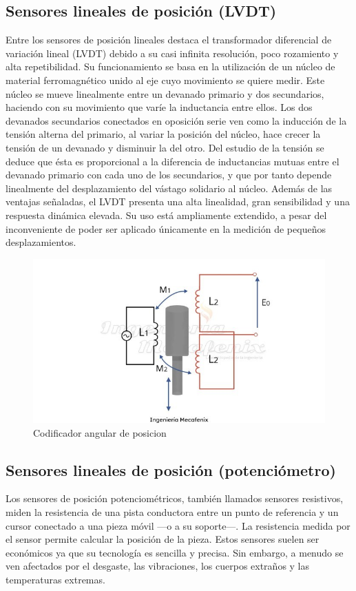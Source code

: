 \subsection{Sensores lineales de posición (LVDT)}

Entre los sensores de posición lineales destaca el transformador diferencial de variación lineal (LVDT) debido a su casi infinita resolución, poco rozamiento y alta repetibilidad. Su funcionamiento se basa en la utilización de un núcleo de material ferromagnético unido al eje cuyo movimiento se quiere medir. Este núcleo se mueve linealmente entre un devanado primario y dos secundarios, haciendo con su movimiento que varíe la inductancia entre ellos.
Los dos devanados secundarios conectados en oposición serie ven como la inducción de la tensión alterna del primario, al variar la posición del núcleo, hace crecer la tensión de un devanado y disminuir la del otro. Del estudio de la tensión se deduce que ésta es proporcional a la diferencia de inductancias mutuas entre el devanado primario con cada uno de los secundarios, y que por tanto depende linealmente del desplazamiento del vástago solidario al núcleo.
 Además de las ventajas señaladas, el LVDT presenta una alta linealidad, gran sensibilidad y una respuesta dinámica elevada. Su uso está ampliamente extendido, a pesar del inconveniente de poder ser aplicado únicamente en la medición de pequeños desplazamientos.

\begin{figure}[h]
	\centering
	\includegraphics[width=0.7\linewidth]{img/sensor posicion.jpg}
	\caption{Codificador angular de posicion}
	\label{fig:insertarimagen}
\end{figure}

\subsection{Sensores lineales de posición (potenciómetro)}

Los sensores de posición potenciométricos, también llamados sensores resistivos, miden la resistencia de una pista conductora entre un punto de referencia y un cursor conectado a una pieza móvil —o a su soporte—. La resistencia medida por el sensor permite calcular la posición de la pieza.
Estos sensores suelen ser económicos ya que su tecnología es sencilla y precisa. Sin embargo, a menudo se ven afectados por el desgaste, las vibraciones, los cuerpos extraños y las temperaturas extremas.

